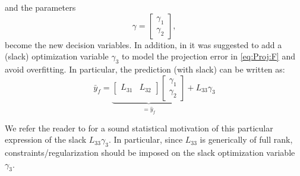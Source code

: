 \documentclass[letterpaper, 10 pt, conference]{ieeeconf}  %
\begin{document}
and the parameters
\begin{equation}\label{eq:gamma}
	\gamma=\begin{bmatrix}
		\gamma_{1}\\
		\gamma_{2}
	\end{bmatrix},
\end{equation}
become the new decision variables. In addition, in \cite{breschi2022uncertainty} it was suggested to add a (slack) optimization variable $\gamma_3$ to model the projection error in \eqref{eq:Proj:F} and avoid overfitting. In particular, the prediction  (with slack) can be written as:
$$
\bar y_f = \underbrace{\begin{bmatrix}
		L_{31} & L_{32} 
	\end{bmatrix} \begin{bmatrix}
		\gamma_{1}\\\gamma_{2}
\end{bmatrix}}_{=\hat y_f} + L_{33}\gamma_3
$$

We refer the reader to \cite{breschi2022uncertainty} for a sound statistical motivation of this particular expression of the slack $L_{33}\gamma_3$. In particular, since $L_{33}$ is generically of full rank, constraints/regularization should be imposed on the slack optimization variable $\gamma_3$.

\end{document}
